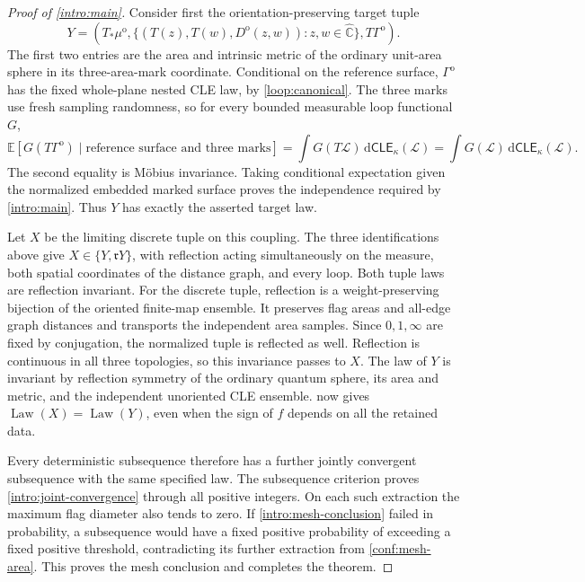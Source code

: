 \documentclass[11pt]{article}
\numberwithin{equation}{section}
\theoremstyle{definition}
\theoremstyle{remark}
\newcommand{\1}{\mathbf 1}
\begin{document}
\begin{proof}[Proof of \cref{intro:main}]
Consider first the orientation-preserving target tuple
\[
 Y=\left(T_*\mu^{\mathrm o},
   \{(T(z),T(w),D^{\mathrm o}(z,w)):z,w\in\widehat{\mathbb C}\},
   T\Gamma^{\mathrm o}\right).
\]
The first two entries are the area and intrinsic metric of the ordinary
unit-area sphere in its three-area-mark coordinate. Conditional on the
reference surface, $\Gamma^{\mathrm o}$ has the fixed whole-plane
nested CLE law, by \cref{loop:canonical}. The three marks use fresh
sampling randomness, so for every bounded measurable loop functional
$G$,
\[
 \mathbb E[G(T\Gamma^{\mathrm o})\mid
           \text{reference surface and three marks}]
 =\int G(T\mathcal L)\,\mathrm d\mathsf{CLE}_{\kappa}(\mathcal L)
 =\int G(\mathcal L)\,\mathrm d\mathsf{CLE}_{\kappa}(\mathcal L).
\]
The second equality is M\"obius invariance. Taking conditional
expectation given the normalized embedded marked surface proves the
independence required by \cref{intro:main}. Thus $Y$ has exactly the
asserted target law.

Let $X$ be the limiting discrete tuple on this coupling. The three
identifications above give $X\in\{Y,\mathfrak r Y\}$, with reflection
acting simultaneously on the measure, both spatial coordinates of the
distance graph, and every loop. Both tuple laws are reflection invariant.
For the discrete tuple, reflection is a weight-preserving bijection of
the oriented finite-map ensemble. It preserves flag areas and all-edge
graph distances and transports the independent area samples. Since
$0,1,\infty$ are fixed by conjugation, the normalized tuple is reflected
as well. Reflection is continuous in all three topologies, so this
invariance passes to $X$. The law of $Y$ is invariant by reflection
symmetry of the ordinary quantum sphere, its area and metric, and the
independent unoriented CLE ensemble.  now gives
$\operatorname{Law}(X)=\operatorname{Law}(Y)$, even when the sign of $f$ depends on all the retained
data.

Every deterministic subsequence therefore has a further jointly
convergent subsequence with the same specified law. The subsequence
criterion proves \eqref{intro:joint-convergence} through all positive
integers. On each such extraction the maximum flag diameter also tends
to zero. If \eqref{intro:mesh-conclusion} failed in probability, a
subsequence would have a fixed positive probability of exceeding a
fixed positive threshold, contradicting its further extraction from
\cref{conf:mesh-area}. This proves the mesh conclusion and completes
the theorem.
\end{proof}


\let\originalbibsection\bibsection
\renewcommand{\bibsection}{
  \originalbibsection
  \addcontentsline{toc}{section}{\refname}}

\end{document}
